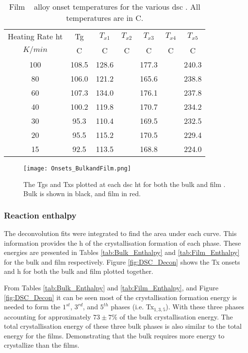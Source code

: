 \documentclass[a4paper,12pt,oneside]{article}%
\begin{document}
\begin{table}[h]
	\centering
	\caption{Film \MgZnCa~ alloy onset temperatures for the various \acrshort{dsc} . All temperatures are in \degree C.}
	\begin{tabular}{ c c c c c c c }
		\toprule
		Heating Rate \acrshort{ht} & \acrshort{Tg} & $T_{x1}$ & $T_{x2}$ & $T_{x3}$ & $T_{x4}$ & $T_{x5}$ \\ 
		$K/min$  & \degree C & \degree C & \degree C & \degree C & \degree C & \degree C \\
		\midrule
		100 & 108.5 & 128.6 &  & 177.3 &  & 240.3 \\
		80  & 106.0 & 121.2 &  & 165.6 &  & 238.8 \\
		60  & 107.3 & 134.0 &  & 176.1 &  & 237.8 \\
		40  & 100.2 & 119.8 &  & 170.7 &  & 234.2 \\
		30  & 95.3  & 110.4 &  & 169.5 &  & 232.5 \\
		20  & 95.5  & 115.2 &  & 170.5 &  & 229.4 \\
		15  & 92.5  & 113.5 &  & 168.8 &  & 224.0 \\
		\bottomrule
	\end{tabular}
	\label{tab:FilmOnsets}
\end{table}

\begin{figure}[b]
	\centering
	\texttt{[image: Onsets\_BulkandFilm.png]}
	\caption[Table of contents Capition]{The \glspl{Tg} and \glspl{Tx} plotted at each \acrshort{dsc} \acrfull{ht} for both the bulk and film \MgZnCa. Bulk is shown in black, and film in red.}%
	\label{fig:DSC_Onsets_BulkFilm}
\end{figure}

\subsubsection{Reaction enthalpy}

The deconvolution fits were integrated to find the area under each curve. This information provides the \gls{h} of the crystallisation formation of each phase. These energies are presented in Tables \ref{tab:Bulk_Enthalpy} and \ref{tab:Film_Enthalpy} for the bulk and film respectively. Figure \ref{fig:DSC_Decon} shows the \gls{Tx} onsets and \acrfull{h} for both the bulk and film plotted together.

From Tables \ref{tab:Bulk_Enthalpy} and \ref{tab:Film_Enthalpy}, and Figure \ref{fig:DSC_Decon} it can be seen most of the crystallisation formation energy is needed to form the $1^{st}$, $3^{rd}$, and $5^{th}$ phases (i.e. \gls{Tx}$_{1, 3, 5}$). With these three phases accounting for approximately $73 \pm 7\%$ of the bulk crystallisation energy. The total crystallisation energy of these three bulk phases is also similar to the total energy for the films. Demonstrating that the bulk requires more energy to crystallize than the films. 
\end{document}
